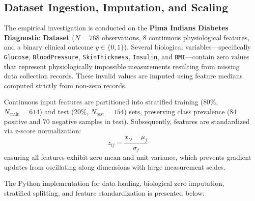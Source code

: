 \documentclass[12pt]{article}
\begin{document}
\subsection{Dataset Ingestion, Imputation, and Scaling}
The empirical investigation is conducted on the \textbf{Pima Indians Diabetes Diagnostic Dataset} ($N = 768$ observations, 8 continuous physiological features, and a binary clinical outcome $y \in \{0, 1\}$). Several biological variables—specifically \texttt{Glucose}, \texttt{BloodPressure}, \texttt{SkinThickness}, \texttt{Insulin}, and \texttt{BMI}—contain zero values that represent physiologically impossible measurements resulting from missing data collection records. These invalid values are imputed using feature medians computed strictly from non-zero records. 

Continuous input features are partitioned into stratified training ($80\%$, $N_{\text{train}} = 614$) and test ($20\%$, $N_{\text{test}} = 154$) sets, preserving class prevalence ($84$ positive and $70$ negative samples in test). Subsequently, features are standardized via z-score normalization:
\begin{equation}
z_{ij} = \frac{x_{ij} - \mu_j}{\sigma_j}
\end{equation}
ensuring all features exhibit zero mean and unit variance, which prevents gradient updates from oscillating along dimensions with large measurement scales.

The Python implementation for data loading, biological zero imputation, stratified splitting, and feature standardization is presented below:
\end{document}

